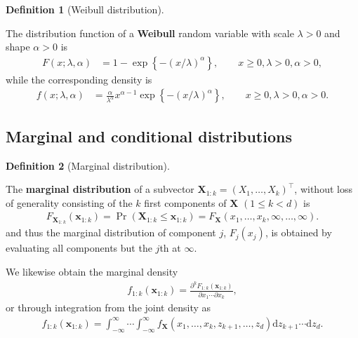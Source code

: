 \documentclass[
  11pt,
  letterpaper,
]{scrbook}
\theoremstyle{definition}
\theoremstyle{definition}
\theoremstyle{definition}
\newtheorem{definition}{Definition}[chapter]
\theoremstyle{plain}
\theoremstyle{plain}
\theoremstyle{remark}
\begin{document}
\begin{definition}[Weibull
distribution]\protect\hypertarget{def-weibull}{}\label{def-weibull}

The distribution function of a \textbf{Weibull} random variable with
scale \(\lambda>0\) and shape \(\alpha>0\) is \begin{align*}
F(x; \lambda, \alpha) &= 1 - \exp\left\{-(x/\lambda)^\alpha\right\}, \qquad x \geq 0, \lambda>0, \alpha>0,
\end{align*} while the corresponding density is \begin{align*}
f(x; \lambda, \alpha) &= \frac{\alpha}{\lambda^\alpha} x^{\alpha-1}\exp\left\{-(x/\lambda)^\alpha\right\}, \qquad x \geq 0, \lambda>0, \alpha>0.
\end{align*}

\end{definition}

\subsection{Marginal and conditional
distributions}\label{marginal-and-conditional-distributions}

\begin{definition}[Marginal
distribution]\protect\hypertarget{def-marginal}{}\label{def-marginal}

The \textbf{marginal distribution} of a subvector
\(\boldsymbol{X}_{1:k}=(X_1, \ldots, X_k)^\top\), without loss of
generality consisting of the \(k\) first components of
\(\boldsymbol{X}\) \((1 \leq k < d)\) is \begin{align*}
 F_{\boldsymbol{X}_{1:k}}(\boldsymbol{x}_{1:k}) = \Pr(\boldsymbol{X}_{1:k} \leq \boldsymbol{x}_{1:k}) = F_{\boldsymbol{X}}(x_1, \ldots, x_k, \infty, \ldots, \infty).
\end{align*} and thus the marginal distribution of component \(j\),
\(F_j(x_j)\), is obtained by evaluating all components but the \(j\)th
at \(\infty\).

We likewise obtain the marginal density \begin{align*}
f_{1:k}(\boldsymbol{x}_{1:k}) = \frac{\partial^k F_{1:k}(\boldsymbol{x}_{1:k})}{\partial x_1 \cdots \partial x_{k}},
\end{align*} or through integration from the joint density as
\begin{align*}
 f_{1:k}(\boldsymbol{x}_{1:k}) = \int_{-\infty}^\infty \cdots  \int_{-\infty}^\infty  f_{\boldsymbol{X}}(x_1, \ldots, x_k, z_{k+1}, \ldots, z_{d}) \mathrm{d} z_{k+1} \cdots \mathrm{d}z_d.
\end{align*}

\end{definition}
\end{document}
